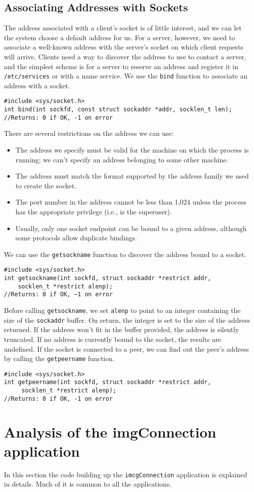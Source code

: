 \documentclass[12pt, letterpaper]{article}
\theoremstyle{definition}
\let\cd\lstinline
\begin{document}
\subsection{Associating Addresses with Sockets}
The address associated with a client's socket is of little interest, and we can let the system choose a default address for us. For a server, however, we need to associate a well-known address with the server's socket on which client requests will arrive. Clients need a way to discover the address to use to contact a server, and the simplest scheme is for a server to reserve an address and register it in \cd+/etc/services+ or with a name service.
We use the \cd+bind+ function to associate an address with a socket.
\begin{lstlisting}
#include <sys/socket.h>
int bind(int sockfd, const struct sockaddr *addr, socklen_t len);
//Returns: 0 if OK, -1 on error
\end{lstlisting}
There are several restrictions on the address we can use:
\begin{itemize}
\item The address we specify must be valid for the machine on which the process is running; we can't specify an address belonging to some other machine.
\item The address must match the format supported by the address family we used to create the socket.
\item The port number in the address cannot be less than 1,024 unless the process has the appropriate privilege (i.e., is the superuser).
\item Usually, only one socket endpoint can be bound to a given address, although some protocols allow duplicate bindings.
\end{itemize}

We can use the \cd+getsockname+ function to discover the address bound to a socket.
\begin{lstlisting}
#include <sys/socket.h>
int getsockname(int sockfd, struct sockaddr *restrict addr, 
	socklen_t *restrict alenp);
//Returns: 0 if OK, −1 on error
\end{lstlisting}
Before calling \cd+getsockname+, we set \cd+alenp+ to point to an integer containing the size of the \cd+sockaddr+ buffer. On return, the integer is set to the size of the address returned. If the address won't fit in the buffer provided, the address is silently truncated. If no address is currently bound to the socket, the results are undefined.
If the socket is connected to a peer, we can find out the peer's address by calling the \cd+getpeername+ function.
\begin{lstlisting}
#include <sys/socket.h>
int getpeername(int sockfd, struct sockaddr *restrict addr,
	 socklen_t *restrict alenp);
//Returns: 0 if OK, -1 on error
\end{lstlisting}

\section{Analysis of the imgConnection application}
In this section the code building up the \lstinline+imcgConnection+ application is explained in details. Much of it is common to all the applications.
\end{document}
